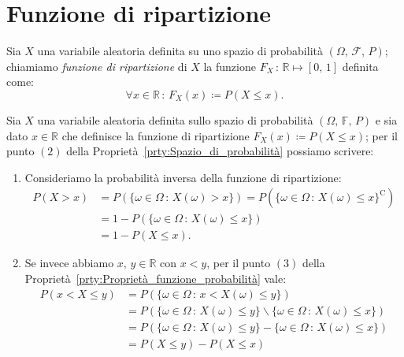     \section{Funzione di ripartizione}
        \begin{defn}\label{defn:Funzione_ripartizione}
            Sia $X$ una variabile aleatoria definita su uno spazio di probabilità $(\Omega,\,\mathscr{F},\,P)$; chiamiamo \emph{funzione di ripartizione} di $X$ la funzione $F_X\,:\, \mathbb{R} \mapsto [0,\,1]$ definita come: \[
                \forall x \in \mathbb{R} \,:\, F_X(x) \coloneqq P(X \leq x)
            .\]
        \end{defn}
        \begin{obsv}\label{obsv:Funzione_ripartizione}
            Sia $X$ una variabile aleatoria definita sullo spazio di probabilità $(\Omega,\,\mathbb{F},\,P)$ e sia dato $x \in \mathbb{R}$ che definisce la funzione di ripartizione $F_X(x) \coloneqq P(X \leq x)$; per il punto $(2)$ della Proprietà~\ref{prty:Spazio_di_probabilità} possiamo scrivere:
            \begin{enumerate}[\indent (a)]
                \item Consideriamo la probabilità inversa della funzione di ripartizione:
                    \begin{align*}
                        P(X > x) &= P(\{\omega \in \Omega \,:\, X(\omega) > x\}) = P(\{\omega \in \Omega \,:\, X(\omega) \leq x\}^{\text{C}}) \\
                                 &= 1 - P(\{\omega \in \Omega \,:\, X(\omega) \leq x\}) \\
                                 &= 1 - P(X \leq x)
                    .\end{align*}
                \item Se invece abbiamo $x,\,y \in \mathbb{R}$ con $x < y$, per il punto $(3)$ della Proprietà~\ref{prty:Proprietà_funzione_probabilità} vale:
                    \begin{align*}
                        P(x < X \leq y) &= P(\{\omega \in \Omega \,:\, x < X(\omega) \leq y\}) \\
                                     &= P(\{\omega \in \Omega \,:\, X(\omega) \leq y\} \backslash \{\omega \in \Omega \,:\, X(\omega) \leq x\}) \\
                                     &= P(\{\omega \in \Omega \,:\, X(\omega) \leq y\} - \{\omega \in \Omega \,:\, X(\omega) \leq x\}) \\
                                     &= P(X \leq y) - P(X \leq x)

\end{align*}
\end{enumerate}
\end{obsv}

